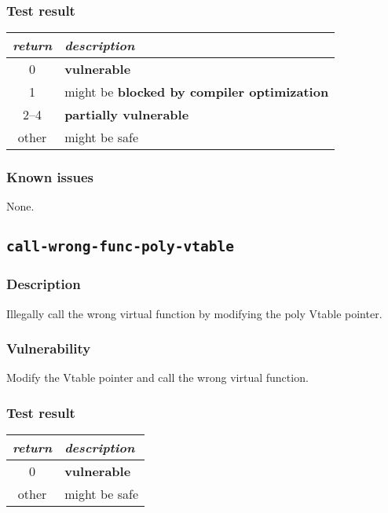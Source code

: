 \documentclass[a4paper]{book}
\begin{document}
\subsubsection{Test result}
\begin{tabular}{cl}
  \toprule
  \emph{return}  & \emph{description} \\
  \midrule
  0              & \textbf{vulnerable} \\
  1              & might be \textbf{blocked by compiler optimization} \\
  2--4           & \textbf{partially vulnerable} \\
  other          & might be safe \\
  \bottomrule
\end{tabular}
  
\subsubsection{Known issues}

None.

\newpage


\subsection{\texttt{call-wrong-func-poly-vtable}}\label{test-call-wrong-func-poly-vtable}

\subsubsection{Description}
Illegally call the wrong virtual function by modifying the poly Vtable pointer.

\subsubsection{Vulnerability}
Modify the Vtable pointer and call the wrong virtual function.

\subsubsection{Test result}
\begin{tabular}{cl}
  \toprule
  \emph{return}  & \emph{description} \\
  \midrule
  0              & \textbf{vulnerable} \\
  other          & might be safe \\
  \bottomrule
\end{tabular}
  
\end{document}
